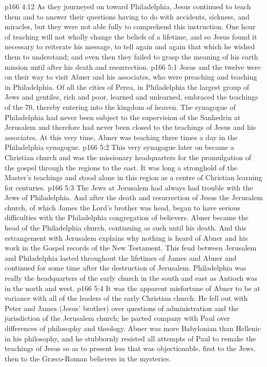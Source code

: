 \vs p166 4:12 \pc As they journeyed on toward Philadelphia, Jesus continued to teach them and to answer their questions having to do with accidents, sickness, and miracles, but they were not able fully to comprehend this instruction. One hour of teaching will not wholly change the beliefs of a lifetime, and so Jesus found it necessary to reiterate his message, to tell again and again that which he wished them to understand; and even then they failed to grasp the meaning of his earth mission until after his death and resurrection.
\vs p166 5:1 Jesus and the twelve were on their way to visit Abner and his associates, who were preaching and teaching in Philadelphia. Of all the cities of Perea, in Philadelphia the largest group of Jews and gentiles, rich and poor, learned and unlearned, embraced the teachings of the 70, thereby entering into the kingdom of heaven. The synagogue of Philadelphia had never been subject to the supervision of the Sanhedrin at Jerusalem and therefore had never been closed to the teachings of Jesus and his associates. At this very time, Abner was teaching three times a day in the Philadelphia synagogue.
\vs p166 5:2 This very synagogue later on became a Christian church and was the missionary headquarters for the promulgation of the gospel through the regions to the east. It was long a stronghold of the Master’s teachings and stood alone in this region as a centre of Christian learning for centuries.
\vs p166 5:3 The Jews at Jerusalem had always had trouble with the Jews of Philadelphia. And after the death and resurrection of Jesus the Jerusalem church, of which James the Lord’s brother was head, began to have serious difficulties with the Philadelphia congregation of believers. Abner became the head of the Philadelphia church, continuing as such until his death. And this estrangement with Jerusalem explains why nothing is heard of Abner and his work in the Gospel records of the New Testament. This feud between Jerusalem and Philadelphia lasted throughout the lifetimes of James and Abner and continued for some time after the destruction of Jerusalem. Philadelphia was really the headquarters of the early church in the south and east as Antioch was in the north and west.
\vs p166 5:4 \pc It was the apparent misfortune of Abner to be at variance with all of the leaders of the early Christian church. He fell out with Peter and James (Jesus’ brother) over questions of administration and the jurisdiction of the Jerusalem church; he parted company with Paul over differences of philosophy and theology. Abner was more Babylonian than Hellenic in his philosophy, and he stubbornly resisted all attempts of Paul to remake the teachings of Jesus so as to present less that was objectionable, first to the Jews, then to the Gr\ae co\hyp{}Roman believers in the mysteries.

